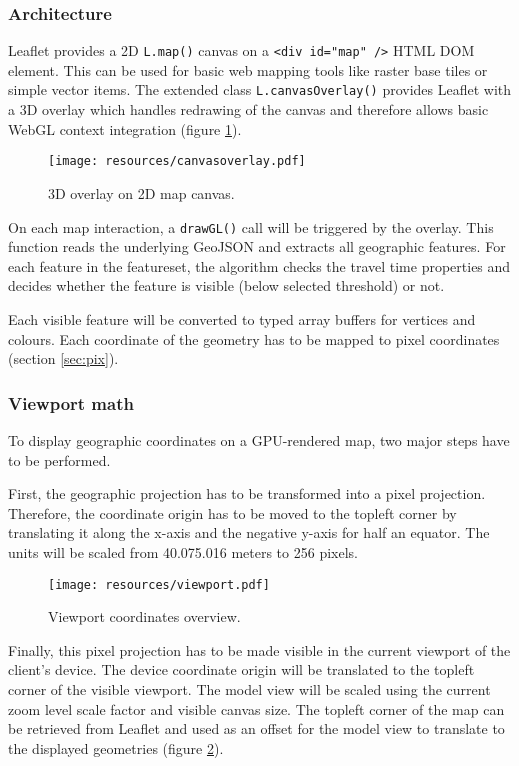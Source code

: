 \documentclass{motivation}
\begin{document}
\subsubsection{Architecture}
  Leaflet provides a 2D \texttt{L.map()} canvas on a \texttt{<div id="map" />} HTML DOM element. This can be used for basic web mapping tools like raster base tiles or simple vector items. The extended class \texttt{L.canvasOverlay()} provides Leaflet with a 3D overlay which handles redrawing of the canvas and therefore allows basic WebGL context integration (figure \ref{fig:overlay}).

  \begin{figure}[h]
    \centering
    \texttt{[image: resources/canvasoverlay.pdf]}
    \caption{3D overlay on 2D map canvas.}
    \label{fig:overlay}
  \end{figure}

  On each map interaction, a \texttt{drawGL()} call will be triggered by the overlay. This function reads the underlying GeoJSON and extracts all geographic features. For each feature in the featureset, the algorithm checks the travel time properties and decides whether the feature is visible (below selected threshold) or not.\par
  Each visible feature will be converted to typed array buffers for vertices and colours. Each coordinate of the geometry has to be mapped to pixel coordinates (section \ref{sec:pix}).

\subsubsection{Viewport math}
  To display geographic coordinates on a GPU-rendered map, two major steps have to be performed.\par
  First, the geographic projection has to be transformed into a pixel projection. Therefore, the coordinate origin has to be moved to the topleft corner by translating it along the x-axis and the negative y-axis for half an equator. The units will be scaled from 40.075.016 meters to 256 pixels.

  \begin{figure}[h]
    \centering
    \texttt{[image: resources/viewport.pdf]}
    \caption{Viewport coordinates overview.}
    \label{fig:viewport}
  \end{figure}

  Finally, this pixel projection has to be made visible in the current viewport of the client's device. The device coordinate origin will be translated to the topleft corner of the visible viewport. The model view will be scaled using the current zoom level scale factor and visible canvas size.  The topleft corner of the map can be retrieved from Leaflet and used as an offset for the model view to translate to the displayed geometries (figure \ref{fig:viewport}).
\end{document}
